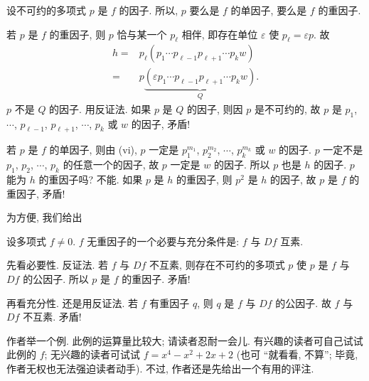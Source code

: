 \begin{pf}
    设不可约的多项式 $p$ 是 $f$ 的因子. 所以, $p$ 要么是 $f$ 的单因子, 要么是 $f$ 的重因子.

    若 $p$ 是 $f$ 的重因子, 则 $p$ 恰与某一个 $p_\ell$ 相伴, 即存在单位 $\varepsilon$ 使 $p_\ell = \varepsilon p$. 故
    \begin{align*}
        h
        = {} & p_\ell (p_1 \cdots p_{\ell - 1} p_{\ell + 1} \cdots p_k w)                          \\
        = {} & p \underbrace{(\varepsilon p_1 \cdots p_{\ell - 1} p_{\ell + 1} \cdots p_k w)}_{Q}.
    \end{align*}
    $p$ 不是 $Q$ 的因子. 用反证法. 如果 $p$ 是 $Q$ 的因子, 则因 $p$ 是不可约的, 故 $p$ 是 $p_1$, $\cdots$, $p_{\ell - 1}$, $p_{\ell + 1}$, $\cdots$, $p_k$ 或 $w$ 的因子, 矛盾!

    若 $p$ 是 $f$ 的单因子, 则由 (vi), $p$ 一定是 $p_1^{m_1}$, $p_2^{m_2}$, $\cdots$, $p_k^{m_k}$ 或 $w$ 的因子. $p$ 一定不是 $p_1$, $p_2$, $\cdots$, $p_k$ 的任意一个的因子, 故 $p$ 一定是 $w$ 的因子. 所以 $p$ 也是 $h$ 的因子. $p$ 能为 $h$ 的重因子吗? 不能. 如果 $p$ 是 $h$ 的重因子, 则 $p^2$ 是 $h$ 的因子, 故 $p$ 是 $f$ 的重因子, 矛盾!
\end{pf}

为方便, 我们给出
\begin{proposition}
    设多项式 $f \neq 0$. $f$ 无重因子的一个必要与充分条件是: $f$ 与 $Df$ 互素.
\end{proposition}

\begin{pf}
    先看必要性. 反证法. 若 $f$ 与 $Df$ 不互素, 则存在不可约的多项式 $p$ 使 $p$ 是 $f$ 与 $Df$ 的公因子. 所以 $p$ 是 $f$ 的重因子. 矛盾!

    再看充分性. 还是用反证法. 若 $f$ 有重因子 $q$, 则 $q$ 是 $f$ 与 $Df$ 的公因子. 故 $f$ 与 $Df$ 不互素. 矛盾!
\end{pf}

作者举一个例. 此例的运算量比较大; 请读者忍耐一会儿. 有兴趣的读者可自己试试此例的 $f$; 无兴趣的读者可试试 $f = x^4-x^2+2 x+2$ (也可 ``就看看, 不算''; 毕竟, 作者无权也无法强迫读者动手). 不过, 作者还是先给出一个有用的评注.

